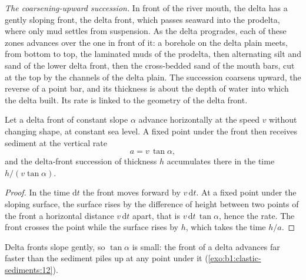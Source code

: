 \emph{The coarsening-upward succession.} In front of the river mouth, the
delta has a gently sloping front, the delta front, which passes seaward into the
prodelta, where only mud settles from suspension. As the delta progrades, each
of these zones advances over the one in front of it: a borehole on the delta
plain meets, from bottom to top, the laminated muds of the prodelta, then
alternating silt and sand of the lower delta front, then the cross-bedded sand
of the mouth bars, cut at the top by the channels of the delta plain. The
succession coarsens upward, the reverse of a point bar, and its thickness is
about the depth of water into which the delta built. Its rate is linked to the
geometry of the delta front.

\begin{proposition}\label{prop:b1:clastic-sediments:progradation}
Let a delta front of constant slope $\alpha$ advance horizontally at the speed
$v$ without changing shape, at constant sea level. A fixed point under the front
then receives sediment at the vertical rate
\[
  a = v\,\tan\alpha,
\]
and the delta-front succession of thickness $h$ accumulates there in the time
$h/(v\tan\alpha)$.
\end{proposition}

\begin{proof}
In the time $\mathrm dt$ the front moves forward by $v\,\mathrm dt$. At a fixed
point under the sloping surface, the surface rises by the difference of
height between two points of the front a horizontal distance $v\,\mathrm dt$
apart, that is $v\,\mathrm dt\,\tan\alpha$, hence the rate. The front crosses
the point while the surface rises by $h$, which takes the time $h/a$.
\end{proof}

Delta fronts slope gently, so $\tan\alpha$ is small: the front of a delta
advances far faster than the sediment piles up at any point under it
(\cref{exo:b1:clastic-sediments:12}).

